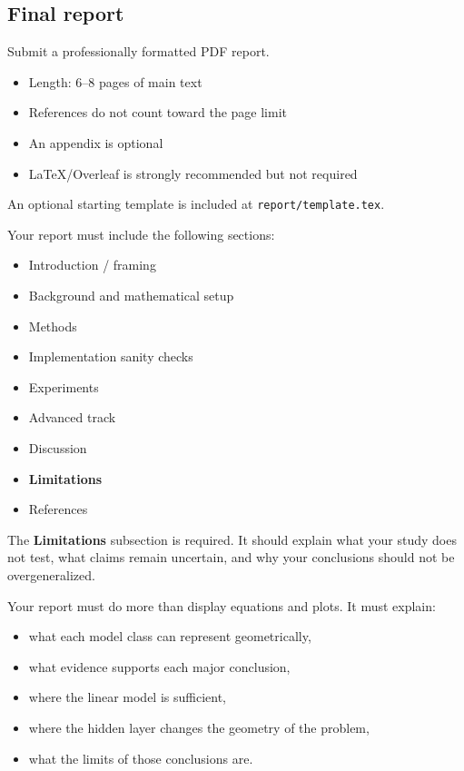 \documentclass[11pt]{article}
\newcommand{\filepath}[1]{\nolinkurl{#1}}
\begin{document}
\subsection{Final report}

Submit a professionally formatted PDF report.

\begin{itemize}
    \item Length: 6--8 pages of main text
    \item References do not count toward the page limit
    \item An appendix is optional
    \item LaTeX/Overleaf is strongly recommended but not required
\end{itemize}

An optional starting template is included at \filepath{report/template.tex}.

Your report must include the following sections:

\begin{itemize}
    \item Introduction / framing
    \item Background and mathematical setup
    \item Methods
    \item Implementation sanity checks
    \item Experiments
    \item Advanced track
    \item Discussion
    \item \textbf{Limitations}
    \item References
\end{itemize}

The \textbf{Limitations} subsection is required. It should explain what your study does not test, what claims remain uncertain, and why your conclusions should not be overgeneralized.

Your report must do more than display equations and plots. It must explain:

\begin{itemize}
    \item what each model class can represent geometrically,
    \item what evidence supports each major conclusion,
    \item where the linear model is sufficient,
    \item where the hidden layer changes the geometry of the problem,
    \item what the limits of those conclusions are.
\end{itemize}
\end{document}
